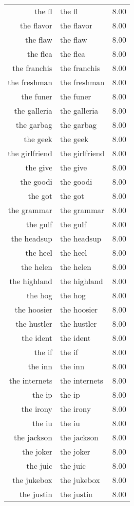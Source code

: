 \begin{table}[ht]
\begin{tabular}{rlr}
  the fl & the fl & 8.00 \\ 
  the flavor & the flavor & 8.00 \\ 
  the flaw & the flaw & 8.00 \\ 
  the flea & the flea & 8.00 \\ 
  the franchis & the franchis & 8.00 \\ 
  the freshman & the freshman & 8.00 \\ 
  the funer & the funer & 8.00 \\ 
  the galleria & the galleria & 8.00 \\ 
  the garbag & the garbag & 8.00 \\ 
  the geek & the geek & 8.00 \\ 
  the girlfriend & the girlfriend & 8.00 \\ 
  the give & the give & 8.00 \\ 
  the goodi & the goodi & 8.00 \\ 
  the got & the got & 8.00 \\ 
  the grammar & the grammar & 8.00 \\ 
  the gulf & the gulf & 8.00 \\ 
  the headsup & the headsup & 8.00 \\ 
  the heel & the heel & 8.00 \\ 
  the helen & the helen & 8.00 \\ 
  the highland & the highland & 8.00 \\ 
  the hog & the hog & 8.00 \\ 
  the hoosier & the hoosier & 8.00 \\ 
  the hustler & the hustler & 8.00 \\ 
  the ident & the ident & 8.00 \\ 
  the if & the if & 8.00 \\ 
  the inn & the inn & 8.00 \\ 
  the internets & the internets & 8.00 \\ 
  the ip & the ip & 8.00 \\ 
  the irony & the irony & 8.00 \\ 
  the iu & the iu & 8.00 \\ 
  the jackson & the jackson & 8.00 \\ 
  the joker & the joker & 8.00 \\ 
  the juic & the juic & 8.00 \\ 
  the jukebox & the jukebox & 8.00 \\ 
  the justin & the justin & 8.00 \\ 

\end{tabular}
\end{table}
